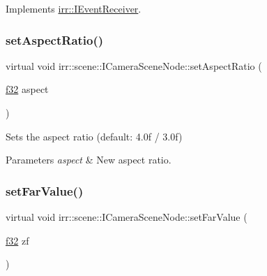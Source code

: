 Implements \hyperlink{classirr_1_1IEventReceiver_a571f744ceffc3b4fe8a81f529163eb97}{irr\+::\+I\+Event\+Receiver}.

\mbox{\label{classirr_1_1scene_1_1ICameraSceneNode_a5c3728a61a208376b9df6a701f4a5b3c}} 
\subsubsection{\texorpdfstring{set\+Aspect\+Ratio()}{setAspectRatio()}}
{\footnotesize\ttfamily virtual void irr\+::scene\+::\+I\+Camera\+Scene\+Node\+::set\+Aspect\+Ratio (\begin{DoxyParamCaption}\item[{\hyperlink{namespaceirr_a0277be98d67dc26ff93b1a6a1d086b07}{f32}}]{aspect }\end{DoxyParamCaption})\hspace{0.3cm}{\ttfamily [pure virtual]}}



Sets the aspect ratio (default\+: 4.\+0f / 3.\+0f) 


\begin{DoxyParams}{Parameters}
{\em aspect} & New aspect ratio. \\
\hline
\end{DoxyParams}
\mbox{\label{classirr_1_1scene_1_1ICameraSceneNode_ab7e427dd639b6bb63f648d6d087da1ea}} 
\subsubsection{\texorpdfstring{set\+Far\+Value()}{setFarValue()}}
{\footnotesize\ttfamily virtual void irr\+::scene\+::\+I\+Camera\+Scene\+Node\+::set\+Far\+Value (\begin{DoxyParamCaption}\item[{\hyperlink{namespaceirr_a0277be98d67dc26ff93b1a6a1d086b07}{f32}}]{zf }\end{DoxyParamCaption})\hspace{0.3cm}{\ttfamily [pure virtual]}}



